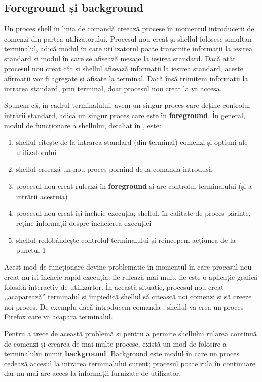 \subsection{Foreground și background}
\label{sec:process:foreground-background}

Un proces shell în linia de comandă creează procese în momentul introducerii de comenzi din partea utilizatorului.
Procesul nou creat și shellul folosesc simultan terminalul, adică modul în care utilizatorul poate transmite informații la ieșirea standard și modul în care se afișează mesaje la ieșirea standard.
Dacă atât procesul nou creat cât și shellul afișează informații la ieșirea standard, aceste afirmații vor fi agregate și afișate la terminal.
Dacă însă trimitem informații la intrarea standard, prin terminal, doar procesul nou creat la va accesa.

Spunem că, în cadrul terminalului, avem un singur proces care deține controlul intrării standard, adică un singur proces care este în \textbf{foreground}.
În general, modul de funcționare a shellului, detaliat în , este:

\begin{enumerate}
  \item shellul citește de la intrarea standard (din terminal) comenzi și opțiuni ale utilizatorului
  \item shellul creează un nou proces pornind de la comanda introdusă
  \item procesul nou creat rulează în \textbf{foreground} și are controlul terminalului (și a intrării acestuia)
  \item procesul nou creat își încheie execuția;
    shellul, în calitate de proces părinte, reține informații despre încheierea execuției
  \item shellul redobândește controlul terminalului și reîncepem acțiunea de la punctul 1
\end{enumerate}

Acest mod de funcționare devine problematic în momentul în care procesul nou creat nu își încheie rapid execuția: fie rulează mai mult, fie este o aplicație grafică folosită interactiv de utilizartor.
În această situație, procesul nou creat ,,acaparează'' terminalul și împiedică shellul să citească noi comenzi și să creeze noi proces.
De exemplu dacă introducem comanda , shellul va crea un proces Firefox care va acapara terminalul.

Pentru a trece de această problemă și pentru a permite shellului rularea continuă de comenzi și crearea de mai multe procese, există un mod de folosire a terminalului numit \textbf{background}.
Background este modul în care un proces cedează accesul la intrarea terminalului curent;
procesul poate rula în continuare dar nu mai are acces la informații furnizate de utilizator.

